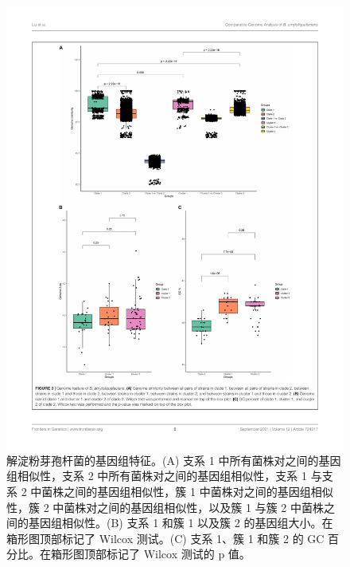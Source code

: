 \documentclass[UTF8]{ctexart}
\begin{document}
\begin{figure}[!htb]
    \centering
    \includegraphics[width=\textwidth]{figures/figure3.pdf}
    \caption{解淀粉芽孢杆菌的基因组特征。(A) 支系 1 中所有菌株对之间的基因组相似性，支系 2 中所有菌株对之间的基因组相似性，支系 1 与支系 2 中菌株之间的基因组相似性，簇 1 中菌株对之间的基因组相似性，簇 2 中菌株对之间的基因组相似性，以及簇 1 与簇 2 中菌株之间的基因组相似性。(B) 支系 1 和簇 1 以及簇 2 的基因组大小。在箱形图顶部标记了 Wilcox 测试。(C) 支系 1、簇 1 和簇 2 的 GC 百分比。在箱形图顶部标记了 Wilcox 测试的 p 值。}
\end{figure}
\end{document}

